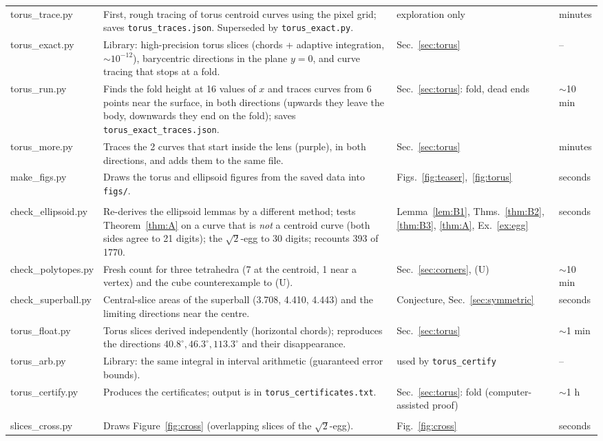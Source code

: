 \documentclass[11pt]{article}
\theoremstyle{plain}
\theoremstyle{definition}
\theoremstyle{remark}
\begin{document}
{\begin{xltabular}{\linewidth}{>{\ttfamily\raggedright\arraybackslash}p{3.4cm} >{\raggedright\arraybackslash}X >{\raggedright\arraybackslash}p{2.6cm} l}
torus\_trace.py & First, rough tracing of torus centroid curves using the pixel grid; saves \texttt{torus\_traces.json}. Superseded by \texttt{torus\_exact.py}. & exploration only & minutes\\
torus\_exact.py & Library: high-precision torus slices (chords + adaptive integration, $\sim10^{-12}$), barycentric directions in the plane $y=0$, and curve tracing that stops at a fold. & Sec.~\ref{sec:torus} & --\\
torus\_run.py & Finds the fold height at 16 values of $x$ and traces curves from 6 points near the surface, in both directions (upwards they leave the body, downwards they end on the fold); saves \texttt{torus\_exact\_traces.json}. & Sec.~\ref{sec:torus}: fold, dead ends & $\sim$10 min\\
torus\_more.py & Traces the 2 curves that start inside the lens (purple), in both directions, and adds them to the same file. & Sec.~\ref{sec:torus} & minutes\\
make\_figs.py & Draws the torus and ellipsoid figures from the saved data into \texttt{figs/}. & Figs.~\ref{fig:teaser},~\ref{fig:torus} & seconds\\
\midrule
{}\\
check\_ellipsoid.py & Re-derives the ellipsoid lemmas by a different method; tests Theorem~\ref{thm:A} on a curve that is \emph{not} a centroid curve (both sides agree to 21 digits); the $\sqrt2$-egg to 30 digits; recounts 393 of 1770. & Lemma~\ref{lem:B1}, Thms.~\ref{thm:B2}, \ref{thm:B3}, \ref{thm:A}, Ex.~\ref{ex:egg} & seconds\\
check\_polytopes.py & Fresh count for three tetrahedra (7 at the centroid, 1 near a vertex) and the cube counterexample to (U). & Sec.~\ref{sec:corners}, (U) & $\sim$10 min\\
check\_superball.py & Central-slice areas of the superball (3.708, 4.410, 4.443) and the limiting directions near the centre. & Conjecture, Sec.~\ref{sec:symmetric} & seconds\\
torus\_float.py & Torus slices derived independently (horizontal chords); reproduces the directions $40.8^\circ,46.3^\circ,113.3^\circ$ and their disappearance. & Sec.~\ref{sec:torus} & $\sim$1 min\\
torus\_arb.py & Library: the same integral in interval arithmetic (guaranteed error bounds). & used by \texttt{torus\_certify} & --\\
torus\_certify.py & Produces the certificates; output is in \texttt{torus\_certificates.txt}. & Sec.~\ref{sec:torus}: fold (computer-assisted proof) & $\sim$1 h\\
\midrule
{}\\
slices\_cross.py & Draws Figure~\ref{fig:cross} (overlapping slices of the $\sqrt2$-egg). & Fig.~\ref{fig:cross} & seconds\\
\bottomrule
\end{xltabular}}
\end{document}
